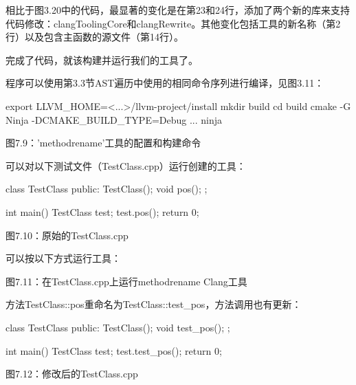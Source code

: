 相比于图3.20中的代码，最显著的变化是在第23和24行，添加了两个新的库来支持代码修改：clangToolingCore和clangRewrite。其他变化包括工具的新名称（第2行）以及包含主函数的源文件（第14行）。

完成了代码，就该构建并运行我们的工具了。


程序可以使用第3.3节AST遍历中使用的相同命令序列进行编译，见图3.11：

\begin{shell}
export LLVM_HOME=<...>/llvm-project/install
mkdir build
cd build
cmake -G Ninja -DCMAKE_BUILD_TYPE=Debug ...
ninja
\end{shell}

\begin{center}
图7.9：'methodrename'工具的配置和构建命令
\end{center}

可以对以下测试文件（TestClass.cpp）运行创建的工具：

\begin{cpp}
class TestClass {
public:
  TestClass(){};
  void pos(){};
};

int main() {
  TestClass test;
  test.pos();
  return 0;
}
\end{cpp}


\begin{center}
图7.10：原始的TestClass.cpp
\end{center}

可以按以下方式运行工具：


\begin{center}
图7.11：在TestClass.cpp上运行methodrename Clang工具
\end{center}

方法TestClass::pos重命名为TestClass::test\_pos，方法调用也有更新：

\begin{cpp}
class TestClass {
public:
  TestClass(){};
  void test_pos(){};
};

int main() {
  TestClass test;
  test.test_pos();
  return 0;
}
\end{cpp}

\begin{center}
图7.12：修改后的TestClass.cpp
\end{center}

